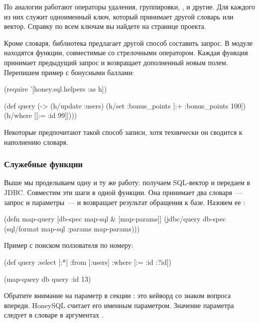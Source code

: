 По аналогии работают операторы удаления, группировки, ,  и другие. Для каждого из них служит одноименный ключ, который принимает другой словарь или вектор. Справку по всем ключам вы найдете на странице проекта.

Кроме словаря, библиотека предлагает другой способ составить запрос. В модуле  находятся функции, совместимые со стрелочными оператором. Каждая функция принимает предыдущий запрос и возвращает дополненный новым полем. Перепишем пример с бонусными баллами:

\begin{english}
  \begin{clojure}
(require '[honey.sql.helpers :as h])

(def query
  (-> (h/update :users)
      (h/set {:bonus_points [:+ :bonus_points 100]})
      (h/where [[:= :id 99]])))
  \end{clojure}
\end{english}

Некоторые предпочитают такой способ записи, хотя технически он сводится к наполнению словаря.

\subsubsection{Служебные функции}

Выше мы проделываем одну и ту же работу: получаем SQL-вектор и передаем в JDBC. Совместим эти шаги в одной функции. Она принимает два словаря~--- запрос и параметры~--- и возвращает результат обращения к базе. Назовем ее :

\begin{english}
  \begin{clojure}
(defn map-query [db-spec map-sql & [map-params]]
  (jdbc/query db-spec (sql/format map-sql {:params map-params})))
  \end{clojure}
\end{english}

Пример с поиском ползователя по номеру:

\begin{english}
  \begin{clojure}
(def query
  {:select [:*]
   :from [:users]
   :where [:= :id :?id]})

(map-query db query {:id 13})
  \end{clojure}
\end{english}

Обратите внимание на параметр  в секции : это кейворд со знаком вопроса впереди. HoneySQL считает его именным параметром. Значение параметра следует в словаре  в аргументах .

